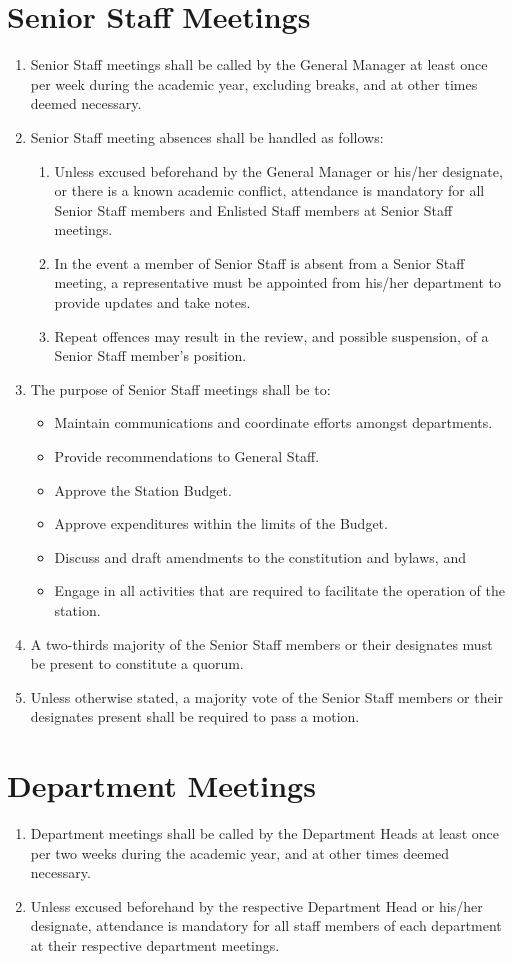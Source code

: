 \documentclass[12pt]{constitution}
\begin{document}
\section{Senior Staff Meetings}
\begin{enumerate}
\item Senior Staff meetings shall be called by the General Manager at least once per week during the academic year, excluding breaks, and at other times deemed necessary.
\item Senior Staff meeting absences shall be handled as follows:
\begin{enumerate}
\item Unless excused beforehand by the General Manager or his/her designate, or there is a known academic conflict, attendance is mandatory for all Senior Staff members and Enlisted Staff members at Senior Staff meetings.
\item In the event a member of Senior Staff is absent from a Senior Staff meeting, a representative must be appointed from his/her department to provide updates and take notes.
\item Repeat offences may result in the review, and possible suspension, of a Senior Staff member's position.
\end{enumerate}
\item The purpose of Senior Staff meetings shall be to:
\begin{itemize}
\item Maintain communications and coordinate efforts amongst departments.
\item Provide recommendations to General Staff.
\item Approve the Station Budget.
\item Approve expenditures within the limits of the Budget.
\item Discuss and draft amendments to the constitution and bylaws, and
\item Engage in all activities that are required to facilitate the operation of the station.
\end{itemize}
\item A two-­thirds majority of the Senior Staff members or their designates must be present to constitute a quorum.
\item Unless otherwise stated, a majority vote of the Senior Staff members or their designates present shall be required to pass a motion.
\end{enumerate}


\section{Department Meetings}
\begin{enumerate}
\item Department meetings shall be called by the Department Heads at least once per two weeks during the academic year, and at other times deemed necessary.
\item Unless excused beforehand by the respective Department Head or his/her designate, attendance is mandatory for all staff members of each department at their respective department meetings.
\end{enumerate}
\end{document}
